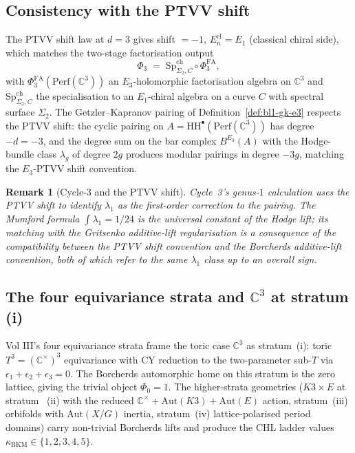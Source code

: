 \documentclass[11pt]{article}
\newtheorem{remark}[theorem]{Remark}
\providecommand{\HH}{\mathrm{HH}}
\providecommand{\Perf}{\mathrm{Perf}}
\providecommand{\C}{\mathbb{C}}
\providecommand{\kBKM}{\kappa_{\mathrm{BKM}}}
\providecommand{\SpCh}{\mathrm{Sp}^{\mathrm{ch}}}
\providecommand{\PhiFA}{\Phi^{\mathrm{FA}}}
\begin{document}
\subsection{Consistency with the PTVV shift}
\label{subsec:bl1-ptvv-shift}

The PTVV shift law at $d = 3$ gives shift $= -1$, $E_n^{\mathrm{cl}}
= E_1$ (classical chiral side), which matches the two-stage
factorisation output
\begin{equation}
  \Phi_3 \;=\; \SpCh_{\Sigma_2, C} \circ \PhiFA_3,
\end{equation}
with $\PhiFA_3(\Perf(\C^3))$ an $E_3$-holomorphic factorisation algebra
on $\C^3$ and $\SpCh_{\Sigma_2, C}$ the specialisation to an
$E_1$-chiral algebra on a curve $C$ with spectral surface $\Sigma_2$.
The Getzler--Kapranov pairing of
Definition~\ref{def:bl1-gk-e3} respects the PTVV shift: the cyclic
pairing on $A = \HH^\bullet(\Perf(\C^3))$ has degree $-d = -3$, and
the degree sum on the bar complex $B^{E_3}(A)$ with the Hodge-bundle
class $\lambda_g$ of degree $2g$ produces modular pairings in degree
$-3g$, matching the $E_3$-PTVV shift convention.

\begin{remark}[Cycle-$3$ and the PTVV shift]
\label{rem:bl1-cycle3-ptvv}
Cycle~3's genus-$1$ calculation uses the PTVV shift to identify
$\lambda_1$ as the first-order correction to the pairing. The
Mumford formula $\int \lambda_1 = 1/24$ is the universal constant of
the Hodge lift; its matching with the Gritsenko additive-lift
regularisation is a consequence of the compatibility between the PTVV
shift convention and the Borcherds additive-lift convention, both of
which refer to the same $\lambda_1$ class up to an overall sign.
\end{remark}

\subsection{The four equivariance strata and $\C^3$ at stratum (i)}
\label{subsec:bl1-four-strata}

Vol III's four equivariance strata frame the toric case $\C^3$ as
stratum~(i): toric $T^3 = (\C^\times)^3$ equivariance with CY reduction
to the two-parameter sub-$T$ via
$\epsilon_1 + \epsilon_2 + \epsilon_3 = 0$. The Borcherds automorphic
home on this stratum is the zero lattice, giving the trivial object
$\Phi_0 = 1$. The higher-strata geometries ($K3 \times E$ at stratum~
(ii) with the reduced $\C^\times + \mathrm{Aut}(K3) + \mathrm{Aut}(E)$
action, stratum~(iii) orbifolds with $\mathrm{Aut}(X/G)$ inertia,
stratum~(iv) lattice-polarised period domains) carry non-trivial
Borcherds lifts and produce the CHL ladder values
$\kBKM \in \{1, 2, 3, 4, 5\}$.
\end{document}

